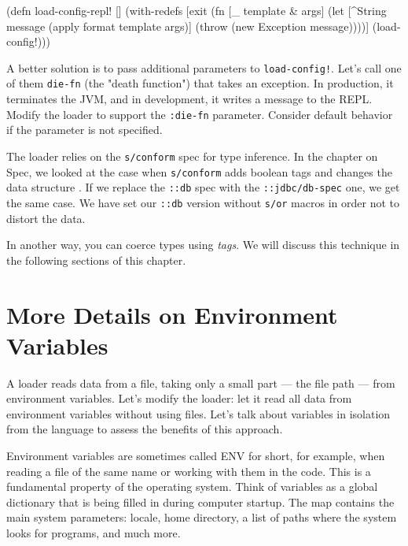 \else

\begin{clojure}
(defn load-config-repl! []
  (with-redefs
    [exit (fn [_ template & args]
            (let [^String message
                  (apply format template args)]
              (throw (new Exception message))))]
    (load-config!)))
\end{clojure}

\fi


A better solution is to pass additional parameters to \texttt{load-config!}. Let's call one of them \verb|die-fn| (the "death function") that takes an exception. In production, it terminates the JVM, and in development, it writes a message to the REPL. Modify the loader to support the \verb|:die-fn| parameter. Consider default behavior if the parameter is not specified.

The loader relies on the \verb|s/conform| spec for type inference. In the chapter on Spec, we looked at the case when \verb|s/conform| adds boolean tags and changes the data structure . If we replace the \verb|::db| spec with the \verb|::jdbc/db-spec| one, we get the same case. We have set our \verb|::db| version without \verb|s/or| macros in order not to distort the data.


In another way, you can coerce types using \emph{tags}. We will discuss this technique in the following sections of this chapter.

\section{More Details on Environment Variables}


A loader reads data from a file, taking only a small part — the file path — from environment variables. Let's modify the loader: let it read all data from environment variables without using files. Let's talk about variables in isolation from the language to assess the benefits of this approach.

Environment variables are sometimes called ENV for short, for example, when reading a file of the same name or working with them in the code. This is a fundamental property of the operating system. Think of variables as a global dictionary that is being filled in during computer startup. The map contains the main system parameters: locale, home directory, a list of paths where the system looks for programs, and much more.

